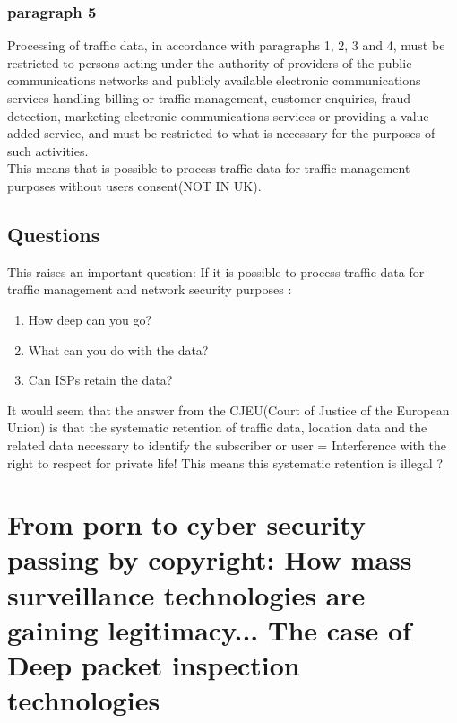 \documentclass[10pt,a4paper]{report}
\begin{document}
\subsection{paragraph 5}
Processing of traffic data, in accordance with paragraphs 1, 2, 3 and 4, must be restricted to persons acting under the authority of providers of the public communications networks and publicly available electronic communications services handling billing or traffic management, customer enquiries, fraud detection, marketing electronic communications services or providing a value added service, and must be restricted to what is necessary for the purposes of such activities.\\ This means that is possible to process traffic data for traffic management purposes without users consent(NOT IN UK).
\section{Questions}
This raises an important question: If it is possible to process traffic data for traffic management and network security purposes : \\
\begin{enumerate}
\item How deep can you go? 
\item What can you do with the data? 
\item Can ISPs retain the data? 
\end{enumerate}
It would seem that the answer from the CJEU(Court of Justice of the European Union) is that the systematic retention of traffic data, location data and the related data necessary to identify the subscriber or user =  Interference with the right to respect for private life! This means this systematic retention is illegal ?
\chapter{From porn to cyber security passing by copyright: How mass surveillance technologies are gaining legitimacy... The case of Deep packet inspection technologies}
\end{document}
